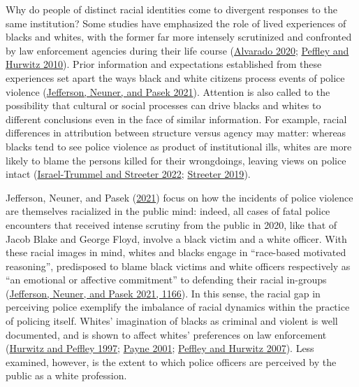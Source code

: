 \documentclass[
  12pt,
]{article}
\begin{document}
Why do people of distinct racial identities come to divergent responses
to the same institution? Some studies have emphasized the role of lived
experiences of blacks and whites, with the former far more intensely
scrutinized and confronted by law enforcement agencies during their life
course (\protect\hyperlink{ref-alvarado2020}{Alvarado 2020};
\protect\hyperlink{ref-peffley2010}{Peffley and Hurwitz 2010}). Prior
information and expectations established from these experiences set
apart the ways black and white citizens process events of police
violence (\protect\hyperlink{ref-jefferson2021}{Jefferson, Neuner, and
Pasek 2021}). Attention is also called to the possibility that cultural
or social processes can drive blacks and whites to different conclusions
even in the face of similar information. For example, racial differences
in attribution between structure versus agency may matter: whereas
blacks tend to see police violence as product of institutional ills,
whites are more likely to blame the persons killed for their
wrongdoings, leaving views on police intact
(\protect\hyperlink{ref-israel-trummel2022}{Israel-Trummel and Streeter
2022}; \protect\hyperlink{ref-streeter2019}{Streeter 2019}).

Jefferson, Neuner, and Pasek
(\protect\hyperlink{ref-jefferson2021}{2021}) focus on how the incidents
of police violence are themselves racialized in the public mind: indeed,
all cases of fatal police encounters that received intense scrutiny from
the public in 2020, like that of Jacob Blake and George Floyd, involve a
black victim and a white officer. With these racial images in mind,
whites and blacks engage in ``race-based motivated reasoning'',
predisposed to blame black victims and white officers respectively as
``an emotional or affective commitment'' to defending their racial
in-groups (\protect\hyperlink{ref-jefferson2021}{Jefferson, Neuner, and
Pasek 2021, 1166}). In this sense, the racial gap in perceiving police
exemplify the imbalance of racial dynamics within the practice of
policing itself. Whites' imagination of blacks as criminal and violent
is well documented, and is shown to affect whites' preferences on law
enforcement (\protect\hyperlink{ref-hurwitz1997}{Hurwitz and Peffley
1997}; \protect\hyperlink{ref-payne2001}{Payne 2001};
\protect\hyperlink{ref-peffley2007}{Peffley and Hurwitz 2007}). Less
examined, however, is the extent to which police officers are perceived
by the public as a white profession.
\end{document}

